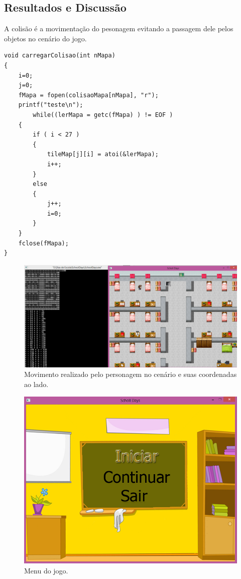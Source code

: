 \documentclass{sciposter}
\begin{document}
\begin{multicols}{2}
\section{Resultados e Discussão}
A colisão é a movimentação do pesonagem evitando a passagem dele pelos objetos no cenário do jogo.
\begin{lstlisting}
void carregarColisao(int nMapa)
{
    i=0;
    j=0;
    fMapa = fopen(colisaoMapa[nMapa], "r"); 
    printf("teste\n");
		while((lerMapa = getc(fMapa) ) != EOF )
    {
        if ( i < 27 )
        {
            tileMap[j][i] = atoi(&lerMapa); 
            i++;
        }
        else 
        {
            j++;
            i=0;
        }
    }
    fclose(fMapa);
}    
\end{lstlisting}
\newline
\newline
\begin{figure}[!htb]
     \centering
     \includegraphics{colisao.png}
     \caption{Movimento realizado pelo personagem no cenário e suas coordenadas ao lado.}
\end{figure}

\begin{figure}[!htb]
     \centering
     \includegraphics{menu.png}
     \caption{Menu do jogo.}
\end{figure}
\renewcommand{\imsize}{0.3\columnwidth}



\end{multicols}
\end{document}

